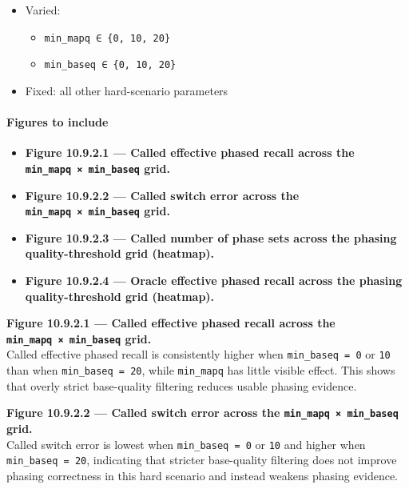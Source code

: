 \documentclass[
]{article}
\providecommand{\tightlist}{%
  \setlength{\itemsep}{0pt}\setlength{\parskip}{0pt}}
\begin{document}
\begin{itemize}
\tightlist
\item
  Varied:

  \begin{itemize}
  \tightlist
  \item
    \texttt{min\_mapq\ ∈\ \{0,\ 10,\ 20\}}
  \item
    \texttt{min\_baseq\ ∈\ \{0,\ 10,\ 20\}}
  \end{itemize}
\item
  Fixed: all other hard-scenario parameters
\end{itemize}

\paragraph{Figures to include}\label{figures-to-include-8}

\begin{itemize}
\tightlist
\item
  \textbf{Figure 10.9.2.1 --- Called effective phased recall across the
  \texttt{min\_mapq\ ×\ min\_baseq} grid.}
\item
  \textbf{Figure 10.9.2.2 --- Called switch error across the
  \texttt{min\_mapq\ ×\ min\_baseq} grid.}
\item
  \textbf{Figure 10.9.2.3 --- Called number of phase sets across the
  phasing quality-threshold grid (heatmap).}
\item
  \textbf{Figure 10.9.2.4 --- Oracle effective phased recall across the
  phasing quality-threshold grid (heatmap).}
\end{itemize}

\textbf{Figure 10.9.2.1 --- Called effective phased recall across the
\texttt{min\_mapq\ ×\ min\_baseq} grid.}\\
Called effective phased recall is consistently higher when
\texttt{min\_baseq\ =\ 0} or \texttt{10} than when
\texttt{min\_baseq\ =\ 20}, while \texttt{min\_mapq} has little visible
effect. This shows that overly strict base-quality filtering reduces
usable phasing evidence.

\textbf{Figure 10.9.2.2 --- Called switch error across the
\texttt{min\_mapq\ ×\ min\_baseq} grid.}\\
Called switch error is lowest when \texttt{min\_baseq\ =\ 0} or
\texttt{10} and higher when \texttt{min\_baseq\ =\ 20}, indicating that
stricter base-quality filtering does not improve phasing correctness in
this hard scenario and instead weakens phasing evidence.
\end{document}
